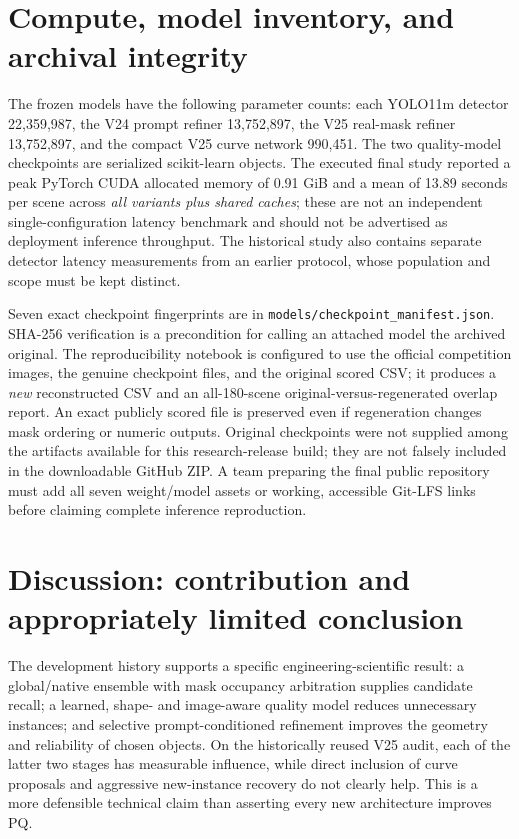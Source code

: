 \documentclass[11pt,a4paper]{article}
\begin{document}
\section{Compute, model inventory, and archival integrity}
The frozen models have the following parameter counts: each YOLO11m detector 22,359,987, the V24 prompt refiner 13,752,897, the V25 real-mask refiner 13,752,897, and the compact V25 curve network 990,451. The two quality-model checkpoints are serialized scikit-learn objects. The executed final study reported a peak PyTorch CUDA allocated memory of 0.91 GiB and a mean of 13.89 seconds per scene across \emph{all variants plus shared caches}; these are not an independent single-configuration latency benchmark and should not be advertised as deployment inference throughput. The historical study also contains separate detector latency measurements from an earlier protocol, whose population and scope must be kept distinct.

Seven exact checkpoint fingerprints are in \texttt{models/checkpoint\_manifest.json}. SHA-256 verification is a precondition for calling an attached model the archived original. The reproducibility notebook is configured to use the official competition images, the genuine checkpoint files, and the original scored CSV; it produces a \emph{new} reconstructed CSV and an all-180-scene original-versus-regenerated overlap report. An exact publicly scored file is preserved even if regeneration changes mask ordering or numeric outputs. Original checkpoints were not supplied among the artifacts available for this research-release build; they are not falsely included in the downloadable GitHub ZIP. A team preparing the final public repository must add all seven weight/model assets or working, accessible Git-LFS links before claiming complete inference reproduction.

\section{Discussion: contribution and appropriately limited conclusion}
The development history supports a specific engineering-scientific result: a global/native ensemble with mask occupancy arbitration supplies candidate recall; a learned, shape- and image-aware quality model reduces unnecessary instances; and selective prompt-conditioned refinement improves the geometry and reliability of chosen objects. On the historically reused V25 audit, each of the latter two stages has measurable influence, while direct inclusion of curve proposals and aggressive new-instance recovery do not clearly help. This is a more defensible technical claim than asserting every new architecture improves PQ.
\end{document}
